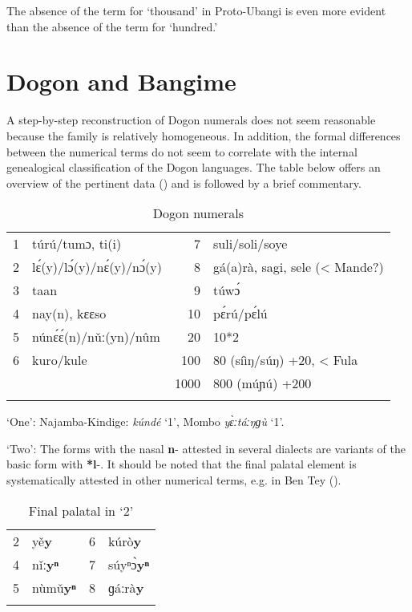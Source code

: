 The absence of the term for ‘thousand’ in Proto-Ubangi is even more evident than the absence of the term for ‘hundred.’

\section{Dogon and Bangime}%

A step-by-step reconstruction of Dogon numerals does not seem reasonable because the family is relatively homogeneous. In addition, the formal differences between the numerical terms do not seem to correlate with the internal genealogical classification of the Dogon languages. The table below offers an overview of the pertinent data () and is followed by a brief commentary. 

\begin{table}
\caption{\label{tab:3:148}Dogon numerals}


\begin{tabularx}{\textwidth}{lXrQ}
\lsptoprule

{1} & túrú/tumɔ, ti(i) & {7} & suli/soli/soye\\
{2} & l{\'{ɛ}}(y)/l{\'{ɔ}}(y)/n{\'{ɛ}}(y)/n{\'{ɔ}}(y) & {8} & gá(a)rà, sagi, sele (< Mande?)\\
{3} & taan & {9} & túw{\'{ɔ}}\\
{4} & nay(n), kɛɛso & {10} & p{\'{ɛ}}rú/p{\'{ɛ}}lú\\
{5} & nún{\'{ɛ}}{\'{ɛ}}(n)/n{\v{u}}ː(yn)/n{\^{u}}m & {20} & 10*2\\
{6} & kuro/kule & {100} & 80 (síìŋ/súŋ) +20, < Fula\\
&  & {1000} & 800 (múɲú) +200\\
\lspbottomrule
\end{tabularx}
\end{table}

‘One’: Najamba-Kindige: \textit{kúndé} ‘1’, Mombo \textit{y{\`{ɛ}}ːtáːŋɡ{\`{u}}} ‘1’.

‘Two’: The forms with the nasal \textbf{n}- attested in several dialects are variants of the basic form with \textbf{*l}-. It should be noted that the final palatal element is systematically attested in other numerical terms, e.g. in Ben Tey ().

\begin{table}
\caption{\label{tab:3:149}Final palatal in `2'}


\begin{tabularx}{\textwidth}{lXlQ}
\lsptoprule

2 & y{\v{e}}\textbf{y} & 6 & kúrò\textbf{y}\\
4 & n{\v{i}}ː\textbf{yⁿ} & 7 & súyⁿ{\`{ɔ}}\textbf{yⁿ}\\
5 & n{\`{u}}m{\v{u}}\textbf{yⁿ} & 8 & ɡáːrà\textbf{y}\\
\lspbottomrule
\end{tabularx}
\end{table}

